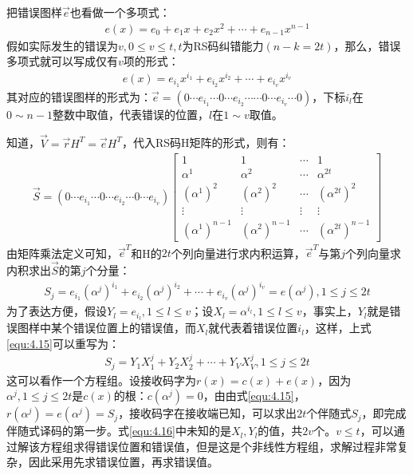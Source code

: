 把错误图样$\vec{e}$也看做一个多项式：
\begin{eqnarray}
  e(x)=e_0+e_1x+e_2x^2+\cdots +e_{n-1}x^{n-1}
  \label{equ:4.12}
\end{eqnarray}
假如实际发生的错误为$v,0\le v\le
t,t$为RS码纠错能力$(n-k=2t)$，那么，错误多项式就可以写成仅有$v$项的形式：
\begin{eqnarray}
  e(x)=e_{i_1}x^{i_1}+e_{i_2}x^{i_2}+\cdots +e_{i_v}x^{i_v}
  \label{equ:4.13}
\end{eqnarray}
其对应的错误图样的形式为：$\vec{e}=(0\cdots e_{i_1}\cdots 0 \cdots
e_{i_2}\cdots \cdots 0\cdots e_{i_v}\cdots 0)$，下标$i_l$在$0\sim
n-1$整数中取值，代表错误的位置，$l$在$1\sim v$取值。

知道，$\vec{V}=\vec{r}H^T=\vec{e}H^T$，代入RS码H矩阵的形式，则有：
\begin{eqnarray}
  \vec{S}=(0\cdots e_{i_1}\cdots 0 \cdots
  e_{i_2}\cdots 0\cdots e_{i_v})\left[\begin{array}{cccc}
    1&1&\cdots&1\\
    \alpha^1&\alpha^2&\cdots&\alpha^{2t}\\
    \left(\alpha^1\right)^2& \left(\alpha^2\right)^2&\cdots&
    \left(\alpha^{2t}\right)^2\\
    \vdots&\vdots&\vdots&\vdots\\
    \left(\alpha^1\right)^{n-1}& \left(\alpha^2\right)^{n-1}&\cdots&
    \left(\alpha^{2t}\right)^{n-1}
  \end{array}\right]
  \label{equ:4.14}
\end{eqnarray}
由矩阵乘法定义可知，$\vec{e}^T$和H的$2t$个列向量进行求内积运算，$\vec{e}^T$与第$j$个列向量求内积求出$\vec{S}$的第$j$个分量：
\begin{eqnarray}
  S_j=e_{i_1}\left(\alpha^j\right)^{i_1}+e_{i_2}\left(\alpha^j\right)^{i_2}+\cdots
  +e_{i_v}\left(\alpha^j\right)^{i_v}=e\left(\alpha^j\right),1\le j\le 2t
  \label{equ:4.15}
\end{eqnarray}
为了表达方便，假设$Y_l=e_{i_l},1\le l\le v$；设$X_l=\alpha^{i_l},1\le l\le
v$，事实上，$Y_l$就是错误图样中某个错误位置上的错误值，而$X_l$就代表着错误位置$i_l$，这样，上式\ref{equ:4.15}可以重写为：
\begin{eqnarray}
  S_j=Y_1X_1^j+Y_2X_2^j+\cdots +Y_VX_V^j,1\le j\le 2t
  \label{equ:4.16}
\end{eqnarray}
这可以看作一个方程组。设接收码字为$r(x)=c(x)+e(x)$，因为$\alpha^j,1\le j\le
2t$是$c(x)$的根：$c(\alpha^j)=0$，由由式\ref{equ:4.15}，$r(\alpha^j)=e(\alpha^j)=S_j$，接收码字在接收端已知，可以求出$2t$个伴随式$S_j$，即完成伴随式译码的第一步。式\ref{equ:4.16}中未知的是$X_l,Y_l$的值，共$2v$个。$v\le
t$，可以通过解该方程组求得错误位置和错误值，但是这是个非线性方程组，求解过程非常复杂，因此采用先求错误位置，再求错误值。

